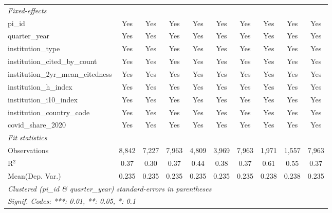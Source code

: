 \begin{tabular}{lccccccccc}
   \midrule
   \emph{Fixed-effects}\\
   pi\_id                                                      & Yes            & Yes            & Yes           & Yes            & Yes            & Yes           & Yes          & Yes         & Yes\\  
   quarter\_year                                               & Yes            & Yes            & Yes           & Yes            & Yes            & Yes           & Yes          & Yes         & Yes\\  
   institution\_type                                           & Yes            & Yes            & Yes           & Yes            & Yes            & Yes           & Yes          & Yes         & Yes\\  
   institution\_cited\_by\_count                               & Yes            & Yes            & Yes           & Yes            & Yes            & Yes           & Yes          & Yes         & Yes\\  
   institution\_2yr\_mean\_citedness                           & Yes            & Yes            & Yes           & Yes            & Yes            & Yes           & Yes          & Yes         & Yes\\  
   institution\_h\_index                                       & Yes            & Yes            & Yes           & Yes            & Yes            & Yes           & Yes          & Yes         & Yes\\  
   institution\_i10\_index                                     & Yes            & Yes            & Yes           & Yes            & Yes            & Yes           & Yes          & Yes         & Yes\\  
   institution\_country\_code                                  & Yes            & Yes            & Yes           & Yes            & Yes            & Yes           & Yes          & Yes         & Yes\\  
   covid\_share\_2020                                          & Yes            & Yes            & Yes           & Yes            & Yes            & Yes           & Yes          & Yes         & Yes\\  
   \midrule
   \emph{Fit statistics}\\
   Observations                                                & 8,842          & 7,227          & 7,963         & 4,809          & 3,969          & 7,963         & 1,971        & 1,557       & 7,963\\  
   R$^2$                                                       & 0.37           & 0.30           & 0.37          & 0.44           & 0.38           & 0.37          & 0.61         & 0.55        & 0.37\\  
Mean(Dep. Var.) & 0.235 & 0.235 & 0.235 & 0.235 & 0.235 & 0.235 & 0.238 & 0.238 & 0.235 \\
   \midrule \midrule
   \multicolumn{10}{l}{\emph{Clustered (pi\_id \& quarter\_year) standard-errors in parentheses}}\\
   \multicolumn{10}{l}{\emph{Signif. Codes: ***: 0.01, **: 0.05, *: 0.1}}\\
\end{tabular}
\par\endgroup
